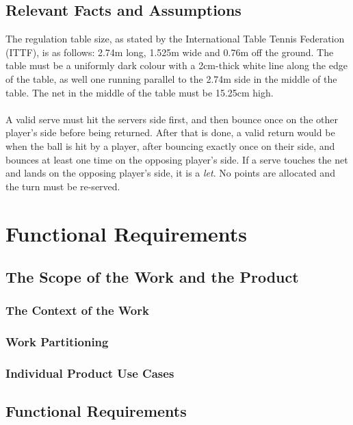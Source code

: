 \documentclass[11pt]{article}
\begin{document}
\subsection{Relevant Facts and Assumptions}
The regulation table size, as stated by the International Table Tennis Federation (ITTF), is as follows: 2.74m long, 1.525m wide and 0.76m off the ground. The table must be a uniformly dark colour with a 2cm-thick white line along the edge of the table, as well one running parallel to the 2.74m side in the middle of the table. The net in the middle of the table must be 15.25cm high. \\\\
A valid serve must hit the servers side first, and then bounce once on the other player's side before being returned. After that is done, a valid return would be when the ball is hit by a player, after bouncing exactly once on their side, and bounces at least one time on the opposing player's side. If a serve touches the net and lands on the opposing player's side, it is a \textit{let}. No points are allocated and the turn must be re-served.

\section{Functional Requirements}

\subsection{The Scope of the Work and the Product}

\subsubsection{The Context of the Work}
\subsubsection{Work Partitioning}
\subsubsection{Individual Product Use Cases}

\subsection{Functional Requirements}
\end{document}
